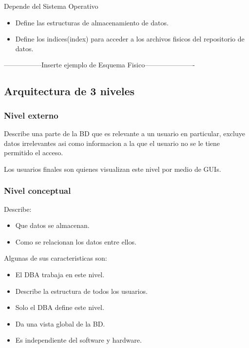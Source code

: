 \documentclass[twoside]{article}
\begin{document}
Depende del Sistema Operativo

\begin{itemize}
  \item Define las estructuras de almacenamiento de datos.
  \item Define los indices(index) para acceder a los archivos fisicos del repositorio de datos.
\end{itemize}

-----------------Inserte ejemplo de Esquema Fisico----------------------


\subsection{Arquitectura de 3 niveles}

\subsubsection{Nivel externo}

Describe una parte de la BD que es relevante a un usuario en particular, excluye datos irrelevantes asi como informacion a la que el usuario
no se le tiene permitido el acceso.

Los usuarios finales son quienes visualizan este nivel por medio de GUIs.

\subsubsection{Nivel conceptual}

Describe:

\begin{itemize}
  \item Que datos se almacenan.
  \item Como se relacionan los datos entre ellos.
\end{itemize}

Algunas de sus caracteristicas son:

\begin{itemize}
  \item El DBA trabaja en este nivel.
  \item Describe la estructura de todos los usuarios.
  \item Solo el DBA define este nivel.
  \item Da una vista global de la BD.
  \item Es independiente del software y hardware.
\end{itemize}
\end{document}
